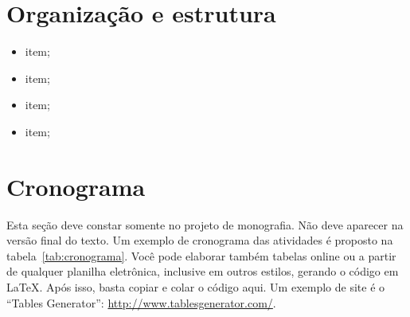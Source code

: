\documentclass[
	12pt,				%
	openright,			%
	twoside,			%
	a4paper,			%
	english,			%
	brazil				%
	]{abntex2}
\begin{document}
\lipsum[8]

\section{Organização e estrutura}

\lipsum*[9-11]

\begin{itemize}
	\item item;
	\item item;
	\item item;
	\item item;
\end{itemize}

\section{Cronograma}

Esta seção deve constar somente no projeto de monografia. Não deve aparecer na versão final do texto. Um exemplo de cronograma das atividades é proposto na tabela~\ref{tab:cronograma}. Você pode elaborar também tabelas online ou a partir de qualquer planilha eletrônica, inclusive em outros estilos, gerando o código em \LaTeX. Após isso, basta copiar e colar o código aqui. Um exemplo de site é o ``Tables Generator'': \url{http://www.tablesgenerator.com/}.
\end{document}
